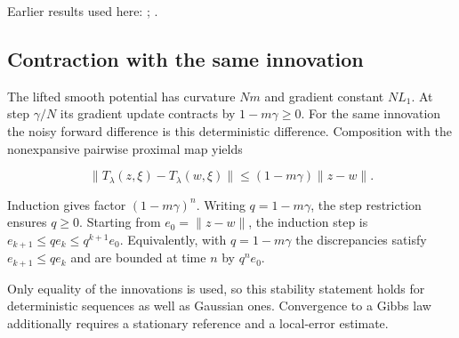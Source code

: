 \documentclass[11pt,a4paper]{report}
\begin{document}
Earlier results used here: \cite[Section~3.1.1]{LangevinLean2026IPLA}; \cite[Section~3.1.2]{LangevinLean2026IPLA}.
\subsection{\texorpdfstring{Contraction with the same innovation}{Contraction with the same innovation}}
\label{report-step-ProximalLangevin-SplittingContraction-lean-2}


The lifted smooth potential has curvature \(Nm\) and gradient constant \(NL_1\). At step \(\gamma/N\) its gradient update contracts by \(1-m\gamma\ge0\). For the same innovation the noisy forward difference is this deterministic difference. Composition with the nonexpansive pairwise proximal map yields

\[\|T_\lambda(z,\xi)-T_\lambda(w,\xi)\|\le(1-m\gamma)\|z-w\|.\]

Induction gives factor \((1-m\gamma)^n\). Writing \(q=1-m\gamma\), the step restriction ensures \(q\ge0\). Starting from \(e_0=\|z-w\|\), the induction step is \(e_{k+1}\le q e_k\le q^{k+1}e_0\). Equivalently, with \(q=1-m\gamma\) the discrepancies satisfy \(e_{k+1}\le q e_k\) and are bounded at time \(n\) by \(q^n e_0\).



Only equality of the innovations is used, so this stability statement holds for deterministic sequences as well as Gaussian ones. Convergence to a Gibbs law additionally requires a stationary reference and a local-error estimate.
\end{document}
